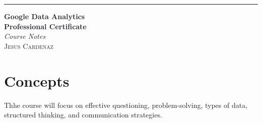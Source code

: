 \documentclass[a4paper]{article}
\begin{document}
    \begin{titlepage}
        \raggedleft
        \rule{1pt}{\textheight}
        \hspace{0.05\textwidth}
        \parbox[b]{0.75\textwidth}{
            {\Huge\bfseries \textcolor[HTML]{2A202C}{Google Data Analytics}\\[0.5\baselineskip] \textcolor[HTML]{2A202C}{Professional Certificate}}\\[2\baselineskip]
            {\large\textit{\textcolor[HTML]{2A202C}{Course Notes}}}\\[4\baselineskip]
            {\Large\textsc{\textcolor[HTML]{2A202C}{Jesus Cardenaz}}}
            
            \vspace{0.5\textheight}
        }
    \end{titlepage}

    \section{Concepts}

    Thhe course will focus on effective questioning, problem-solving, types of data, 
    structured thinking, and communication strategies. 
\end{document}
